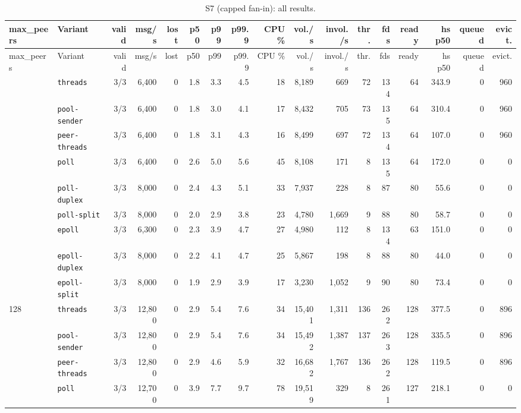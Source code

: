 \begin{longtable}{@{}llrrrrrrrrrrrrrrr@{}}
\caption{S7 (capped fan-in): all results.}\label{tab:full-S7}\\
\toprule
max\_peers & Variant & valid & msg/s & lost & p50 & p99 & p99.9 & CPU \% & vol./s & invol./s & thr. & fds & ready & hs p50 & queued & evict. \\
\midrule
\endfirsthead
\toprule
max\_peers & Variant & valid & msg/s & lost & p50 & p99 & p99.9 & CPU \% & vol./s & invol./s & thr. & fds & ready & hs p50 & queued & evict. \\
\midrule
\endhead
\bottomrule
\endfoot
64 & \texttt{threads} & 3/3 & 6{,}400 & 0 & 1.8 & 3.3 & 4.5 & 18 & 8{,}189 & 669 & 72 & 134 & 64 & 343.9 & 0 & 960 \\
 & \texttt{pool-sender} & 3/3 & 6{,}400 & 0 & 1.8 & 3.0 & 4.1 & 17 & 8{,}432 & 705 & 73 & 135 & 64 & 310.4 & 0 & 960 \\
 & \texttt{peer-threads} & 3/3 & 6{,}400 & 0 & 1.8 & 3.1 & 4.3 & 16 & 8{,}499 & 697 & 72 & 134 & 64 & 107.0 & 0 & 960 \\
 & \texttt{poll} & 3/3 & 6{,}400 & 0 & 2.6 & 5.0 & 5.6 & 45 & 8{,}108 & 171 & 8 & 135 & 64 & 172.0 & 0 & 0 \\
 & \texttt{poll-duplex} & 3/3 & 8{,}000 & 0 & 2.4 & 4.3 & 5.1 & 33 & 7{,}937 & 228 & 8 & 87 & 80 & 55.6 & 0 & 0 \\
 & \texttt{poll-split} & 3/3 & 8{,}000 & 0 & 2.0 & 2.9 & 3.8 & 23 & 4{,}780 & 1{,}669 & 9 & 88 & 80 & 58.7 & 0 & 0 \\
 & \texttt{epoll} & 3/3 & 6{,}300 & 0 & 2.3 & 3.9 & 4.7 & 27 & 4{,}980 & 112 & 8 & 134 & 63 & 151.0 & 0 & 0 \\
 & \texttt{epoll-duplex} & 3/3 & 8{,}000 & 0 & 2.2 & 4.1 & 4.7 & 25 & 5{,}867 & 198 & 8 & 88 & 80 & 44.0 & 0 & 0 \\
 & \texttt{epoll-split} & 3/3 & 8{,}000 & 0 & 1.9 & 2.9 & 3.9 & 17 & 3{,}230 & 1{,}052 & 9 & 90 & 80 & 73.4 & 0 & 0 \\
\midrule
128 & \texttt{threads} & 3/3 & 12{,}800 & 0 & 2.9 & 5.4 & 7.6 & 34 & 15{,}401 & 1{,}311 & 136 & 262 & 128 & 377.5 & 0 & 896 \\
 & \texttt{pool-sender} & 3/3 & 12{,}800 & 0 & 2.9 & 5.4 & 7.6 & 34 & 15{,}492 & 1{,}387 & 137 & 263 & 128 & 335.5 & 0 & 896 \\
 & \texttt{peer-threads} & 3/3 & 12{,}800 & 0 & 2.9 & 4.6 & 5.9 & 32 & 16{,}682 & 1{,}767 & 136 & 262 & 128 & 119.5 & 0 & 896 \\
 & \texttt{poll} & 3/3 & 12{,}700 & 0 & 3.9 & 7.7 & 9.7 & 78 & 19{,}519 & 329 & 8 & 261 & 127 & 218.1 & 0 & 0 \\

\end{longtable}
